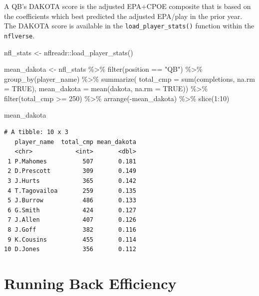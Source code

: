 \documentclass[
  letterpaper,
]{krantz}
\newenvironment{Shaded}{\begin{snugshade}}{\end{snugshade}}
\newcommand{\AttributeTok}[1]{\textcolor[rgb]{0.40,0.45,0.13}{#1}}
\newcommand{\ConstantTok}[1]{\textcolor[rgb]{0.56,0.35,0.01}{#1}}
\newcommand{\DecValTok}[1]{\textcolor[rgb]{0.68,0.00,0.00}{#1}}
\newcommand{\FunctionTok}[1]{\textcolor[rgb]{0.28,0.35,0.67}{#1}}
\newcommand{\NormalTok}[1]{\textcolor[rgb]{0.00,0.23,0.31}{#1}}
\newcommand{\OtherTok}[1]{\textcolor[rgb]{0.00,0.23,0.31}{#1}}
\newcommand{\SpecialCharTok}[1]{\textcolor[rgb]{0.37,0.37,0.37}{#1}}
\newcommand{\StringTok}[1]{\textcolor[rgb]{0.13,0.47,0.30}{#1}}
\begin{document}
A QB's DAKOTA score is the adjusted EPA+CPOE composite that is based on
the coefficients which best predicted the adjusted EPA/play in the prior
year. The DAKOTA score is available in the
\texttt{load\_player\_stats()} function within the \texttt{nflverse}.

\begin{Shaded}
\begin{Highlighting}[]
\NormalTok{nfl\_stats }\OtherTok{\textless{}{-}}\NormalTok{ nflreadr}\SpecialCharTok{::}\FunctionTok{load\_player\_stats}\NormalTok{()}

\NormalTok{mean\_dakota }\OtherTok{\textless{}{-}}\NormalTok{ nfl\_stats }\SpecialCharTok{\%\textgreater{}\%}
  \FunctionTok{filter}\NormalTok{(position }\SpecialCharTok{==} \StringTok{"QB"}\NormalTok{) }\SpecialCharTok{\%\textgreater{}\%}
  \FunctionTok{group\_by}\NormalTok{(player\_name) }\SpecialCharTok{\%\textgreater{}\%}
  \FunctionTok{summarize}\NormalTok{(}
    \AttributeTok{total\_cmp =} \FunctionTok{sum}\NormalTok{(completions, }\AttributeTok{na.rm =} \ConstantTok{TRUE}\NormalTok{),}
    \AttributeTok{mean\_dakota =} \FunctionTok{mean}\NormalTok{(dakota, }\AttributeTok{na.rm =} \ConstantTok{TRUE}\NormalTok{)) }\SpecialCharTok{\%\textgreater{}\%}
  \FunctionTok{filter}\NormalTok{(total\_cmp }\SpecialCharTok{\textgreater{}=} \DecValTok{250}\NormalTok{) }\SpecialCharTok{\%\textgreater{}\%}
  \FunctionTok{arrange}\NormalTok{(}\SpecialCharTok{{-}}\NormalTok{mean\_dakota) }\SpecialCharTok{\%\textgreater{}\%}
  \FunctionTok{slice}\NormalTok{(}\DecValTok{1}\SpecialCharTok{:}\DecValTok{10}\NormalTok{)}

\NormalTok{mean\_dakota}
\end{Highlighting}
\end{Shaded}

\begin{verbatim}
# A tibble: 10 x 3
   player_name  total_cmp mean_dakota
   <chr>            <int>       <dbl>
 1 P.Mahomes          507       0.181
 2 D.Prescott         309       0.149
 3 J.Hurts            365       0.142
 4 T.Tagovailoa       259       0.135
 5 J.Burrow           486       0.133
 6 G.Smith            424       0.127
 7 J.Allen            407       0.126
 8 J.Goff             382       0.116
 9 K.Cousins          455       0.114
10 D.Jones            356       0.112
\end{verbatim}

\hypertarget{running-back-efficiency}{%
\section{Running Back Efficiency}\label{running-back-efficiency}}
\end{document}
